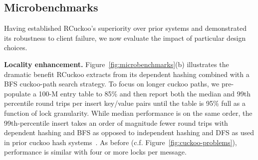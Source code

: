 \subsection{Microbenchmarks}
\label{ss:mb}

Having established RCuckoo's superiority over prior systems and
demonstrated its robustness to client failure, we now evaluate the
impact of particular design choices.






\textbf{Locality enhancement.}
Figure~\ref{fig:microbenchmarks}(b) illustrates the dramatic benefit
RCuckoo extracts from its dependent hashing combined with a BFS
cuckoo-path search strategy.  To focus on longer cuckoo paths, we
pre-populate a 100-M entry table to 85\% and then report both the median
and 99th percentile round trips per insert 
key/value pairs until the table is 95\% full as a function of lock
granularity.  While median performance is on the same order, the
99th-percentile insert takes an order of magnitude fewer round trips
with dependent hashing and BFS as opposed to independent hashing and
DFS as used in prior cuckoo hash
systems~\cite{cuckoo-improvements,pilaf,cuckoo}.  As before
(c.f. Figure~\ref{fig:cuckoo-problems}), performance is similar with
four or more locks per message.


